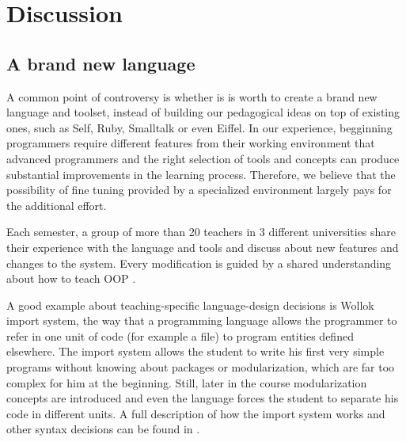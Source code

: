 \section{Discussion}
\label{sec:discussion}


\subsection{A brand new language}
\label{sec:newLanguage}
A common point of controversy is whether is is worth to create a brand new language and toolset, 
instead of building our pedagogical ideas on top of existing ones, such as Self, Ruby, Smalltalk or even Eiffel.
In our experience, begginning programmers require different features from their working environment that advanced programmers
and the right selection of tools and concepts can produce substantial improvements in the learning process.
Therefore, we believe that the possibility of fine tuning provided by a specialized environment largely pays for the additional effort.

Each semester, a group of more than 20 teachers in 3 different universities share their experience with the language and tools and discuss about new features and changes to the system. 
Every modification is guided by a shared understanding about how to teach OOP \cite{lombardi_instances_2007,lombardi_carlos_alumnos_2008,griggio_programming_2011,spigariol_lucas_ensenando_2013}.

A good example about teaching-specific language-design decisions is Wollok import system,
\ie the way that a programming language allows the programmer to refer in one unit of code (for example a file) to program entities defined elsewhere.
The import system allows the student to write his first very simple programs without knowing about packages or modularization, which are far too complex for him at the beginning. Still, later in the course modularization concepts are introduced and even the language forces the student to separate his code in different units. 
A full description of how the import system works and other syntax decisions can be found in \cite{javier_fernandes_wollok_2014}.

